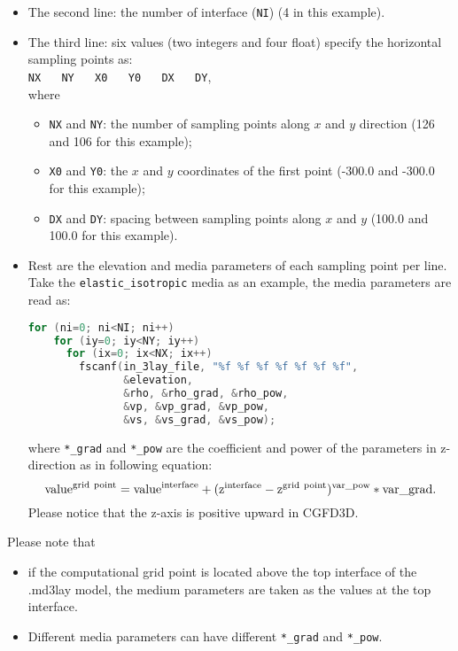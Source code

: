 \begin{itemize}
\begin{itemize}
    \end{itemize}

  \item The second line: the number of interface (\texttt{NI}) (4 in this example).

  \item The third line:
    six values (two integers and four float) specify the horizontal sampling points as:\\
    \texttt{NX} ~~ \texttt{NY} ~~ \texttt{X0} ~~ \texttt{Y0} ~~ \texttt{DX} ~~ \texttt{DY}, \\
    where
    \begin{itemize}
      \item \texttt{NX} and \texttt{NY}:
          the number of sampling points along $x$ and $y$ direction (126 and 106 for this example);
      \item \texttt{X0} and \texttt{Y0}: 
        the $x$ and $y$ coordinates of the first point (-300.0 and -300.0 for this example);
      \item \texttt{DX} and \texttt{DY}:
        spacing between sampling points along $x$ and $y$ (100.0 and 100.0 for this example).
    \end{itemize}

 \item 
  Rest are the elevation and media parameters of each sampling point per line.
  Take the \texttt{elastic\_isotropic} media as an example, the media parameters are read as:
  \begin{lstlisting}[language = C]
  for (ni=0; ni<NI; ni++)
    for (iy=0; iy<NY; iy++) 
      for (ix=0; ix<NX; ix++) 
        fscanf(in_3lay_file, "%f %f %f %f %f %f %f", 
               &elevation,
               &rho, &rho_grad, &rho_pow,
               &vp, &vp_grad, &vp_pow,
               &vs, &vs_grad, &vs_pow);
  \end{lstlisting}
  where \texttt{*\_grad} and \texttt{*\_pow} are the coefficient and power of the parameters
    in z-direction as in following equation:
   \begin{equation*}
     \rm{value}^{\rm{grid~point}} = \rm{value}^{\rm{interface}}
        + (z^{\rm{interface}}-z^{\rm{grid~point}})^{var\_pow} * var\_grad.
   \end{equation*}
   Please notice that the z-axis is positive upward in CGFD3D.

\end{itemize}

Please note that
\begin{itemize}
  \item if the computational grid point is located above the top interface of the .md3lay model,
the medium parameters are taken as the values at the top interface.
  \item Different media parameters can have different \texttt{*\_grad} and \texttt{*\_pow}.
\end{itemize}

